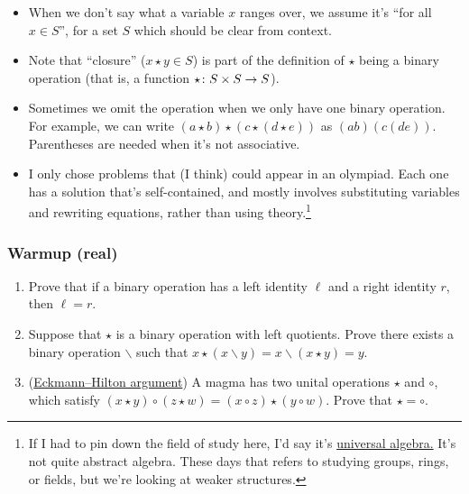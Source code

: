 \documentclass[11pt,paper=letter]{scrartcl}
\newcommand{\qunder}{\mathbin{\backslash}}
\begin{document}
\begin{itemize}
\item When we don't say what a variable $x$ ranges over, we assume it's ``for all $x \in S$'', for a set $S$ which should be clear from context.

\item Note that ``closure'' ($x \star y \in S$) is part of the definition of $\star$ being a binary operation (that is, a function $\star \colon S \times S \to S$).

\item Sometimes we omit the operation when we only have one binary operation. For example, we can write $(a \star b) \star (c \star (d \star e))$ as $(ab)(c(de))$. Parentheses are needed when it's not associative.

\item I only chose problems that (I think) could appear in an olympiad. Each one has a solution that's self-contained, and mostly involves substituting variables and rewriting equations, rather than using theory.\footnote{If I had to pin down the field of study here, I'd say it's \href{https://en.wikipedia.org/wiki/Universal_algebra}{universal algebra.} It's not quite abstract algebra. These days that refers to studying groups, rings, or fields, but we're looking at weaker structures.}
\end{itemize}

\subsubsection*{Warmup (real)}

\begin{enumerate}
\item Prove that if a binary operation has a left identity $\ell$ and a right identity $r$, then $\ell = r$.

\item \label{warmup2} Suppose that $\star$ is a binary operation with left quotients. Prove there exists a binary operation $\qunder$ such that $x \star (x \qunder y) = x \qunder (x \star y) = y$.

\item (\href{https://en.wikipedia.org/wiki/Eckmann\%E2\%80\%93Hilton_argument}{Eckmann--Hilton argument}) A magma has two unital operations $\star$ and $\circ$, which satisfy $(x \star y) \circ (z \star w) = (x \circ z) \star (y \circ w)$. Prove that $\star = \circ$.

\end{enumerate}
\end{document}
